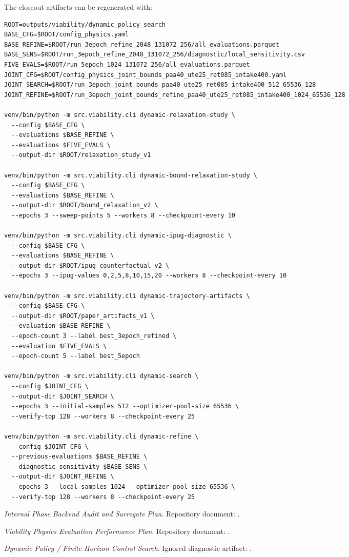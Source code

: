 \documentclass[10pt]{article}
\begin{document}
The closeout artifacts can be regenerated with:
\begingroup
\footnotesize
\begin{verbatim}
ROOT=outputs/viability/dynamic_policy_search
BASE_CFG=$ROOT/config_physics.yaml
BASE_REFINE=$ROOT/run_3epoch_refine_2048_131072_256/all_evaluations.parquet
BASE_SENS=$ROOT/run_3epoch_refine_2048_131072_256/diagnostic/local_sensitivity.csv
FIVE_EVALS=$ROOT/run_5epoch_1024_131072_256/all_evaluations.parquet
JOINT_CFG=$ROOT/config_physics_joint_bounds_paa40_ute25_ret085_intake400.yaml
JOINT_SEARCH=$ROOT/run_3epoch_joint_bounds_paa40_ute25_ret085_intake400_512_65536_128
JOINT_REFINE=$ROOT/run_3epoch_joint_bounds_refine_paa40_ute25_ret085_intake400_1024_65536_128

venv/bin/python -m src.viability.cli dynamic-relaxation-study \
  --config $BASE_CFG \
  --evaluations $BASE_REFINE \
  --evaluations $FIVE_EVALS \
  --output-dir $ROOT/relaxation_study_v1

venv/bin/python -m src.viability.cli dynamic-bound-relaxation-study \
  --config $BASE_CFG \
  --evaluations $BASE_REFINE \
  --output-dir $ROOT/bound_relaxation_v2 \
  --epochs 3 --sweep-points 5 --workers 8 --checkpoint-every 10

venv/bin/python -m src.viability.cli dynamic-ipug-diagnostic \
  --config $BASE_CFG \
  --evaluations $BASE_REFINE \
  --output-dir $ROOT/ipug_counterfactual_v2 \
  --epochs 3 --ipug-values 0,2,5,8,10,15,20 --workers 8 --checkpoint-every 10

venv/bin/python -m src.viability.cli dynamic-trajectory-artifacts \
  --config $BASE_CFG \
  --output-dir $ROOT/paper_artifacts_v1 \
  --evaluation $BASE_REFINE \
  --epoch-count 3 --label best_3epoch_refined \
  --evaluation $FIVE_EVALS \
  --epoch-count 5 --label best_5epoch

venv/bin/python -m src.viability.cli dynamic-search \
  --config $JOINT_CFG \
  --output-dir $JOINT_SEARCH \
  --epochs 3 --initial-samples 512 --optimizer-pool-size 65536 \
  --verify-top 128 --workers 8 --checkpoint-every 25

venv/bin/python -m src.viability.cli dynamic-refine \
  --config $JOINT_CFG \
  --previous-evaluations $BASE_REFINE \
  --diagnostic-sensitivity $BASE_SENS \
  --output-dir $JOINT_REFINE \
  --epochs 3 --local-samples 1024 --optimizer-pool-size 65536 \
  --verify-top 128 --workers 8 --checkpoint-every 25
\end{verbatim}
\endgroup

\begin{thebibliography}{9}
\raggedright

\textit{Internal Phase Backend Audit and Surrogate Plan}.
Repository document:
.

\bibitem{physics-performance}
\textit{Viability Physics Evaluation Performance Plan}.
Repository document:
.

\bibitem{dynamic-report}
\textit{Dynamic Policy / Finite-Horizon Control Search}.
Ignored diagnostic artifact:
.

\end{thebibliography}
\end{document}
